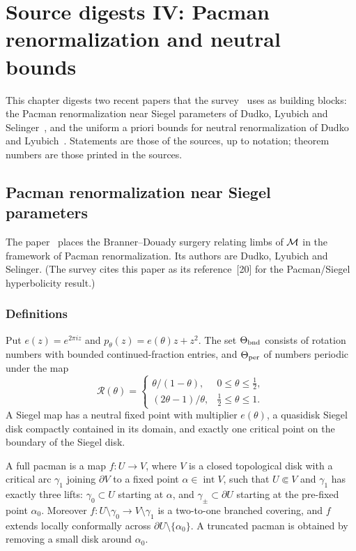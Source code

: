 \chapter[Pacman and neutral bounds]{Source digests IV: Pacman renormalization and neutral bounds}
\label{ch:digests-pacman-neutral}

This chapter digests two recent papers that the survey~\cite{DudkoMLC} uses as
building blocks: the Pacman renormalization near Siegel parameters of
Dudko, Lyubich and Selinger~\cite{DudkoLyubichSelinger}, and the uniform a priori
bounds for neutral renormalization of Dudko and Lyubich~\cite{DudkoLyubichNeutral}.
Statements are those of the sources, up to notation; theorem numbers are those
printed in the sources.

\section{Pacman renormalization near Siegel parameters}
\label{sec:digest-pacman}

The paper~\cite{DudkoLyubichSelinger} places the Branner--Douady surgery relating
limbs of $\mathcal M$ in the framework of Pacman renormalization.  Its authors are
Dudko, Lyubich and Selinger.  (The survey cites this paper as its reference~[20]
for the Pacman/Siegel hyperbolicity result.)

\subsection*{Definitions}

\begin{definition}
\label{def:pacman-rotation}
Put $e(z)=e^{2\pi iz}$ and $p_\theta(z)=e(\theta)z+z^2$.  The set $\Theta_{\rm bnd}$ consists of
rotation numbers with bounded continued-fraction entries, and $\Theta_{\rm per}$ of
numbers periodic under the map
\[
 \mathcal R(\theta)=\begin{cases}\theta/(1-\theta), & 0\le\theta\le\tfrac12,\\
                      (2\theta-1)/\theta, & \tfrac12\le\theta\le1.\end{cases}
\]
A Siegel map has a neutral fixed point with multiplier $e(\theta)$, a quasidisk
Siegel disk compactly contained in its domain, and exactly one critical point on the
boundary of the Siegel disk.
\end{definition}

\begin{definition}
\label{def:pacman-full}
A full pacman is a map $f\colon U\to V$, where $V$ is a closed topological disk with a
critical arc $\gamma_1$ joining $\partial V$ to a fixed point $\alpha\in\operatorname{int}V$,
such that $U\Subset V$ and $\gamma_1$ has exactly three lifts: $\gamma_0\subset U$ starting
at $\alpha$, and $\gamma_\pm\subset\partial U$ starting at the pre-fixed point $\alpha_0$.
Moreover $f\colon U\setminus\gamma_0\to V\setminus\gamma_1$ is a two-to-one branched covering,
and $f$ extends locally conformally across $\partial U\setminus\{\alpha_0\}$.  A truncated
pacman is obtained by removing a small disk around $\alpha_0$.
\end{definition}

